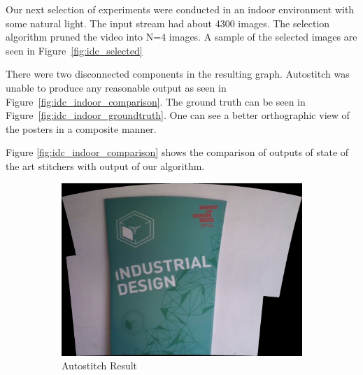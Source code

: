 Our next selection of experiments were conducted in an indoor
environment with some natural light.  The input stream had about 4300
images. The selection algorithm pruned the video into N=4 images. A
sample of the selected images are seen in Figure~\ref{fig:idc_selected}

There were two disconnected components in the resulting graph.
Autostitch was unable to produce any reasonable output as seen in
Figure~\ref{fig:idc_indoor_comparison}.  The ground truth can be seen
in Figure~\ref{fig:idc_indoor_groundtruth}.  One can see a better
orthographic view of the posters in a composite manner.


Figure \ref{fig:idc_indoor_comparison} shows the comparison of outputs of state
of the art stitchers with output of our algorithm. 

\begin{figure}
\begin{subfigure}[b]{0.45\textwidth}
\includegraphics[width=\linewidth]{figures/idc_indoor/autostitch.jpg}
\caption{Autostitch Result}
\end{subfigure}
\begin{subfigure}[b]{0.45\textwidth}

\end{subfigure}
\end{figure}
